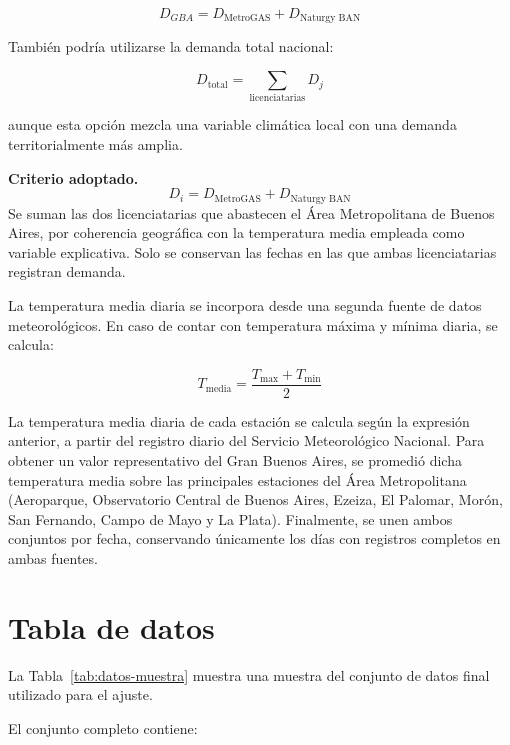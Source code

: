 \documentclass[12pt,a4paper]{article}
\begin{document}
\[
    D_{GBA} = D_{\text{MetroGAS}} + D_{\text{Naturgy BAN}}
\]

También podría utilizarse la demanda total nacional:

\[
    D_{\text{total}} = \sum_{\text{licenciatarias}} D_j
\]

aunque esta opción mezcla una variable climática local con una demanda territorialmente más amplia.

\begin{methodbox}
\textbf{Criterio adoptado.}
\[
    D_i = \boxed{D_{\text{MetroGAS}} + D_{\text{Naturgy BAN}}}
\]
Se suman las dos licenciatarias que abastecen el Área Metropolitana de Buenos Aires, por coherencia geográfica con la temperatura media empleada como variable explicativa. Solo se conservan las fechas en las que ambas licenciatarias registran demanda.
\end{methodbox}

La temperatura media diaria se incorpora desde una segunda fuente de datos meteorológicos. En caso de contar con temperatura máxima y mínima diaria, se calcula:

\[
    T_{\text{media}} = \frac{T_{\max} + T_{\min}}{2}
\]

La temperatura media diaria de cada estación se calcula según la expresión anterior, a partir del registro diario del Servicio Meteorológico Nacional. Para obtener un valor representativo del Gran Buenos Aires, se promedió dicha temperatura media sobre las principales estaciones del Área Metropolitana (Aeroparque, Observatorio Central de Buenos Aires, Ezeiza, El Palomar, Morón, San Fernando, Campo de Mayo y La Plata). Finalmente, se unen ambos conjuntos por fecha, conservando únicamente los días con registros completos en ambas fuentes.

\section{Tabla de datos}

La Tabla~\ref{tab:datos-muestra} muestra una muestra del conjunto de datos final utilizado para el ajuste.

\begin{table}[H]
\centering
\caption{Muestra de datos utilizados para el ajuste}
\label{tab:datos-muestra}

\end{table}

El conjunto completo contiene:
\end{document}
